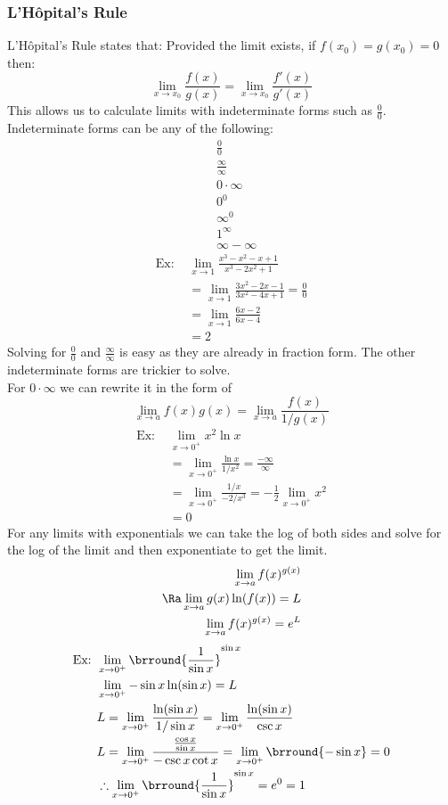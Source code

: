 \subsubsection{L'H\^opital's Rule}
L'H\^opital's Rule states that: Provided the limit exists, if $f(x_0)=g(x_0)=0$ then:
$$\lim_{x\to x_0}\frac{f(x)}{g(x)}=\lim_{x\to x_0}\frac{f'(x)}{g'(x)}$$
This allows us to calculate limits with indeterminate forms such as $\frac{0}{0}$.\\
Indeterminate forms can be any of the following:
\begin{align*}
    &\frac{0}{0}\\
    &\frac{\infty}{\infty}\\
    &0\cdot\infty\\
    &0^0\\
    &\infty^0\\
    &1^\infty\\
    &\infty-\infty
\end{align*}
\begin{align*}
    \text{Ex: }&\lim_{x\to 1}\frac{x^3-x^2-x+1}{x^3-2x^2+1}\\
    &=\lim_{x\to 1}\frac{3x^2-2x-1}{3x^2-4x+1}=\frac{0}{0}\\
    &=\lim_{x\to 1}\frac{6x-2}{6x-4}\\
    &=2
\end{align*}
Solving for $\frac{0}{0}$ and $\frac{\infty}{\infty}$ is easy as they are already in fraction form. The other indeterminate forms are trickier to solve.\\
For $0\cdot\infty$ we can rewrite it in the form of
    $$\lim_{x\to a}f(x)g(x)=\lim_{x\to a}\frac{f(x)}{1/g(x)}$$
\begin{align*}
    \text{Ex: }&\lim_{x\to 0^+}x^2\ln x\\
    &=\lim_{x\to 0^+}\frac{\ln x}{1/x^2}=\frac{-\infty}{\infty}\\
    &=\lim_{x\to 0^+}\frac{1/x}{-2/x^3}=-\frac{1}{2}\lim_{x\to 0^+}x^2\\
    &=0
\end{align*}
For any limits with exponentials we can take the log of both sides and solve for the log of the limit and then exponentiate to get the limit.
\begin{align*}
    \lim_{x\to a}f(x)^{g(x)}\\
    \Ra\lim_{x\to a}g(x)\ln(f(x))=L\\
    \lim_{x\to a}f(x)^{g(x)}=e^L
\end{align*}
\begin{align*}
    \text{Ex: }&\lim_{x\to 0^+}\brround{\frac{1}{\sin x}}^{\sin x}\\
    &\lim_{x\to 0^+}-\sin x\ln(\sin x)=L\\
    &L=\lim_{x\to 0^+}\frac{\ln(\sin x)}{1/\sin x}=\lim_{x\to 0^+}\frac{\ln(\sin x)}{\csc x}\\
    &L=\lim_{x\to 0^+}\frac{\frac{\cos x}{\sin x}}{-\csc x\cot x}=\lim_{x\to 0^+}\brround{-\sin x}=0\\
    &\therefore \lim_{x\to 0^+}\brround{\frac{1}{\sin x}}^{\sin x}=e^0=1
\end{align*}
